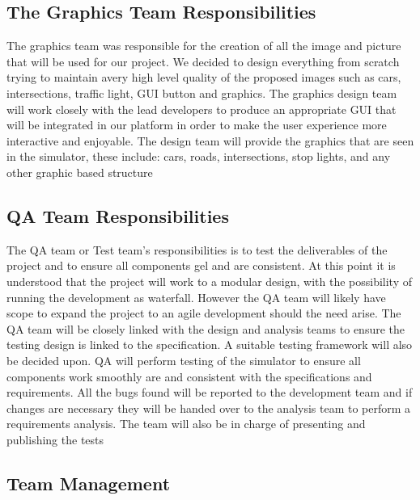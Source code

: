 \documentclass[oneside]{article}
\begin{document}
\subsection{The Graphics Team Responsibilities}

The graphics team was responsible for the creation of all the image and picture that will be used for our project. We decided to design everything from scratch trying to maintain avery  high level quality of the proposed images such as cars, intersections, traffic light, GUI button and graphics.
The graphics design team will work closely with the lead developers to produce an appropriate GUI that will be integrated in our platform in order to make the user experience more interactive and enjoyable. The design team will provide the graphics that are seen in the simulator, these include: cars, roads, intersections, stop lights, and any other graphic based structure

\subsection{QA Team Responsibilities}

The QA team or Test team's responsibilities is to test the deliverables of the project and to ensure all components gel and are consistent. At this point it is understood that the project will work to a modular design, with the possibility of running the development as waterfall. However the QA team will likely have scope to expand the project to an agile development should the need arise.
The QA team will be closely linked with the design and analysis teams to ensure the testing design is linked to the specification. A suitable testing framework will also be decided upon.
QA will perform testing of the simulator to ensure all components work smoothly are and consistent with the specifications and requirements. All the bugs found will be reported to the development team and if changes are necessary they will be handed over to the analysis team to perform a requirements analysis. The team will also be in charge of presenting and publishing the tests


\subsection{Team Management}
\end{document}
